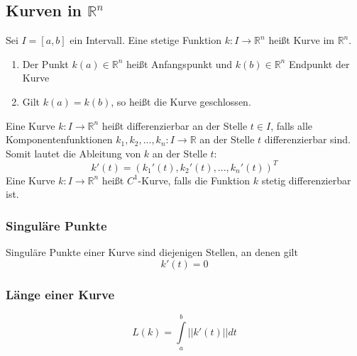 \documentclass[a4paper,twocolumn,10pt]{article}
\begin{document}
\subsection{Kurven in $\mathbb{R}^n$}
Sei $I=[a,b]$ ein Intervall. Eine stetige Funktion $k:I\rightarrow\mathbb{R}^n$ heißt Kurve im $\mathbb{R}^n$.
\begin{enumerate}[label=$\bullet$]
\item Der Punkt $k(a)\in\mathbb{R}^n$ heißt Anfangspunkt und $k(b)\in\mathbb{R}^n$ Endpunkt der Kurve
\item Gilt $k(a)=k(b)$, so heißt die Kurve geschlossen.
\end{enumerate}
Eine Kurve $k:I\rightarrow\mathbb{R}^n$ heißt differenzierbar an der Stelle $t\in I$, falls alle Komponentenfunktionen $k_1,k_2,...,k_n:I\rightarrow\mathbb{R}$ an der Stelle $t$ differenzierbar sind. Somit lautet die Ableitung von $k$ an der Stelle $t$:
\begin{equation*}
k'(t)=(k_1'(t), k_2'(t),...,k_n'(t))^T
\end{equation*}
Eine Kurve $k:I\rightarrow\mathbb{R}^n$ heißt $C^1$-Kurve, falls die Funktion $k$ stetig differenzierbar ist.

\subsubsection{Singuläre Punkte}
Singuläre Punkte einer Kurve sind diejenigen Stellen, an denen gilt
\begin{equation*}
k'(t)=0
\end{equation*}

\subsubsection{Länge einer Kurve}
\begin{equation*}
L(k)=\int\limits_{a}^{b}||k'(t)||dt
\end{equation*}
\end{document}
